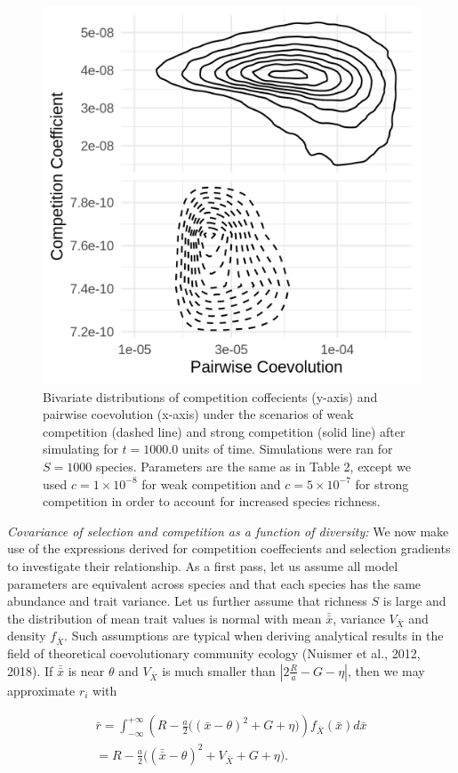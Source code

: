 \documentclass[]{elsarticle} %
\begin{document}
\begin{figure}

{\centering \includegraphics[width=0.6\linewidth]{on_pl} 

}

\caption{\label{net}Bivariate distributions of competition coffecients (y-axis) and pairwise coevolution (x-axis) under the scenarios of weak competition (dashed line) and strong competition (solid line) after simulating for $t=1000.0$ units of time. Simulations were ran for $S=1000$ species. Parameters are the same as in Table 2, except we used $c=1\times 10^{-8}$ for weak competition and $c=5\times 10^{-7}$ for strong competition in order to account for increased species richness.}\label{fig:unnamed-chunk-8}
\end{figure}

\emph{Covariance of selection and competition as a function of
diversity:} We now make use of the expressions derived for competition
coeffecients and selection gradients to investigate their relationship.
As a first pass, let us assume all model parameters are equivalent
across species and that each species has the same abundance and trait
variance. Let us further assume that richness \(S\) is large and the
distribution of mean trait values is normal with mean \(\bar{\bar x}\),
variance \(V_{\bar X}\) and density \(f_{\bar X}\). Such assumptions are
typical when deriving analytical results in the field of theoretical
coevolutionary community ecology (Nuismer et al., 2012, 2018). If
\(\bar{\bar x}\) is near \(\theta\) and \(V_{\bar X}\) is much smaller
than \(|2\frac{R}{a}-G-\eta|\), then we may approximate \(r_i\) with

\begin{multline}
\bar r=\int_{-\infty}^{+\infty}\left(R-\frac{a}{2}\Big((\bar x-\theta)^2+G+\eta\Big)\right)f_{\bar X}(\bar x)d\bar x \\
=R-\frac{a}{2}\Big((\bar{\bar x}-\theta)^2+V_{\bar X}+G+\eta\Big).
\end{multline}
\end{document}
